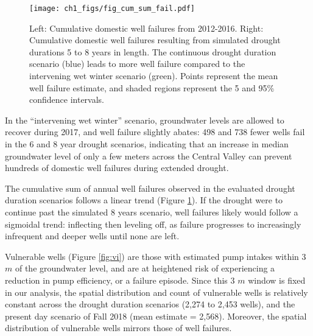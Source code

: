 \begin{figure}%
	\texttt{[image: ch1\_figs/fig\_cum\_sum\_fail.pdf]}
	\caption{Left: Cumulative domestic well failures from 2012-2016. Right: Cumulative domestic well failures resulting from simulated drought durations 5 to 8 years in length. The continuous drought duration scenario (blue) leads to more well failure compared to the intervening wet winter scenario (green). Points represent the mean well failure estimate, and shaded regions represent the 5 and 95\% confidence intervals. %
	}
	\label{fig:cum_sum_failure}
\end{figure}


In the ``intervening wet winter'' scenario, groundwater levels are allowed to recover during 2017, and well failure slightly abates: 498 and 738 fewer wells fail in the 6 and 8 year drought scenarios, indicating that an increase in median groundwater level of only a few meters across the Central Valley can prevent hundreds of domestic well failures during extended drought.  


The cumulative sum of annual well failures observed in the evaluated drought duration scenarios follows a linear trend (Figure \ref{fig:cum_sum_failure}). If the drought were to continue past the simulated 8 years scenario, well failures likely would follow a sigmoidal trend: inflecting then leveling off, as failure progresses to increasingly infrequent and deeper wells until none are left.  

Vulnerable wells (Figure \ref{fig:vi}) are those with estimated pump intakes within 3 $m$ of the groundwater level, and are at heightened risk of experiencing a reduction in pump efficiency, or a failure episode. Since this 3 $m$ window is fixed in our analysis, the spatial distribution and count of vulnerable wells is relatively constant across the drought duration scenarios (2,274 to 2,453 wells), and the present day scenario of Fall 2018 (mean estimate = 2,568). Moreover, the spatial distribution of vulnerable wells mirrors those of well failures.

